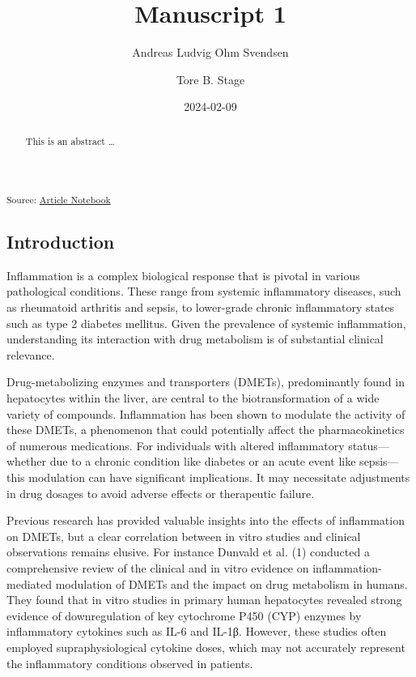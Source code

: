 \documentclass[
  letterpaper,
  DIV=11,
  numbers=noendperiod,
  oneside]{scrartcl}
\title{Manuscript 1}
\author{Andreas Ludvig Ohm Svendsen \and Tore B. Stage}
\date{2024-02-09}
\begin{document}
\maketitle
\begin{abstract}
This is an abstract \ldots{}
\end{abstract}

\textsubscript{Source:
\href{https://andreasludvig.github.io/manuscript/index.qmd.html}{Article
Notebook}}

\subsection{Introduction}\label{introduction}

Inflammation is a complex biological response that is pivotal in various
pathological conditions. These range from systemic inflammatory
diseases, such as rheumatoid arthritis and sepsis, to lower-grade
chronic inflammatory states such as type 2 diabetes mellitus. Given the
prevalence of systemic inflammation, understanding its interaction with
drug metabolism is of substantial clinical relevance.

Drug-metabolizing enzymes and transporters (DMETs), predominantly found
in hepatocytes within the liver, are central to the biotransformation of
a wide variety of compounds. Inflammation has been shown to modulate the
activity of these DMETs, a phenomenon that could potentially affect the
pharmacokinetics of numerous medications. For individuals with altered
inflammatory status---whether due to a chronic condition like diabetes
or an acute event like sepsis---this modulation can have significant
implications. It may necessitate adjustments in drug dosages to avoid
adverse effects or therapeutic failure.

Previous research has provided valuable insights into the effects of
inflammation on DMETs, but a clear correlation between in vitro studies
and clinical observations remains elusive. For instance Dunvald et al.
(1) conducted a comprehensive review of the clinical and in vitro
evidence on inflammation-mediated modulation of DMETs and the impact on
drug metabolism in humans. They found that in vitro studies in primary
human hepatocytes revealed strong evidence of downregulation of key
cytochrome P450 (CYP) enzymes by inflammatory cytokines such as IL-6 and
IL-1β. However, these studies often employed supraphysiological cytokine
doses, which may not accurately represent the inflammatory conditions
observed in patients.
\end{document}

